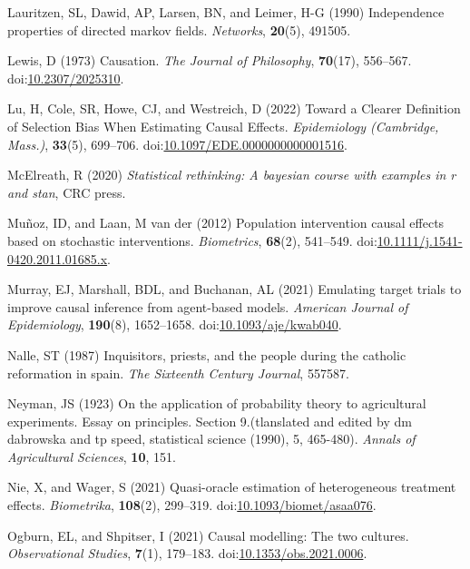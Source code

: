 \documentclass[
  singlecolumn,
  9pt]{article}
\begin{document}
\begin{CSLReferences}
Lauritzen, SL, Dawid, AP, Larsen, BN, and Leimer, H-G (1990)
Independence properties of directed markov fields. \emph{Networks},
\textbf{20}(5), 491505.

Lewis, D (1973) Causation. \emph{The Journal of Philosophy},
\textbf{70}(17), 556--567.
doi:\href{https://doi.org/10.2307/2025310}{10.2307/2025310}.

Lu, H, Cole, SR, Howe, CJ, and Westreich, D (2022) Toward a Clearer
Definition of Selection Bias When Estimating Causal Effects.
\emph{Epidemiology (Cambridge, Mass.)}, \textbf{33}(5), 699--706.
doi:\href{https://doi.org/10.1097/EDE.0000000000001516}{10.1097/EDE.0000000000001516}.

McElreath, R (2020) \emph{Statistical rethinking: A bayesian course with
examples in r and stan}, CRC press.

Muñoz, ID, and Laan, M van der (2012) Population intervention causal
effects based on stochastic interventions. \emph{Biometrics},
\textbf{68}(2), 541--549.
doi:\href{https://doi.org/10.1111/j.1541-0420.2011.01685.x}{10.1111/j.1541-0420.2011.01685.x}.

Murray, EJ, Marshall, BDL, and Buchanan, AL (2021) Emulating target
trials to improve causal inference from agent-based models.
\emph{American Journal of Epidemiology}, \textbf{190}(8), 1652--1658.
doi:\href{https://doi.org/10.1093/aje/kwab040}{10.1093/aje/kwab040}.

Nalle, ST (1987) Inquisitors, priests, and the people during the
catholic reformation in spain. \emph{The Sixteenth Century Journal},
557587.

Neyman, JS (1923) On the application of probability theory to
agricultural experiments. Essay on principles. Section 9.(tlanslated and
edited by dm dabrowska and tp speed, statistical science (1990), 5,
465-480). \emph{Annals of Agricultural Sciences}, \textbf{10}, 151.

Nie, X, and Wager, S (2021) Quasi-oracle estimation of heterogeneous
treatment effects. \emph{Biometrika}, \textbf{108}(2), 299--319.
doi:\href{https://doi.org/10.1093/biomet/asaa076}{10.1093/biomet/asaa076}.

Ogburn, EL, and Shpitser, I (2021) Causal modelling: The two cultures.
\emph{Observational Studies}, \textbf{7}(1), 179--183.
doi:\href{https://doi.org/10.1353/obs.2021.0006}{10.1353/obs.2021.0006}.


\end{CSLReferences}
\end{document}
